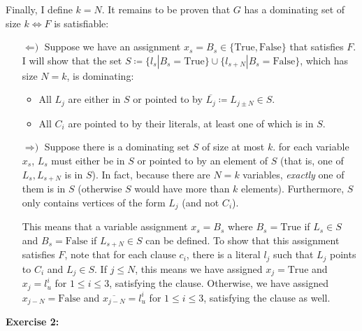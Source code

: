 \documentclass{amsart}
\theoremstyle{plain}
\theoremstyle{definition}
\begin{document}
    Finally, I define $k = N$.
    It remains to be proven that $G$ has a dominating set of size $k \iff F$ is satisfiable:


    \begin{itemize}

        \item[$\Longleftarrow\text{)}$] Suppose we have an assignment $x_s = B_s \in \{\text{True}, \text{False}\}$
        that satisfies $F$.
        I will show that the set $S \coloneqq \{l_s | B_s = \text{True}\} \cup \{l_{s+N} | B_s = \text{False}\}$,
        which has size $N=k$, is dominating:
        \begin{itemize}
            \item All $L_j$ are either in $S$ or pointed to by $ \overline{L_j} \coloneqq L_{j \pm N} \in S$.
            \item All $C_i$ are pointed to by their literals, at least one of which is in $S$.
        \end{itemize}

        \item[$\Longrightarrow\text{)}$] Suppose there is a dominating set $S$ of size at most $k$.
        for each variable $x_s$, $L_s$ must either be in $S$ or pointed to by an element of $S$
        (that is, one of $L_s, L_{s+N}$ is in $S$). In fact, because there are $N=k$ variables,
        \emph{exactly} one of them is in $S$ (otherwise $S$ would have more than $k$ elements).
        Furthermore, $S$ only contains vertices of the form $L_j$ (and not $C_i$).

        This means that a variable assignment $x_s = B_s$ where $B_s = \text{True}$
        if $L_s \in S$ and $B_s = \text{False}$ if $L_{s+N} \in S$ can be defined.
        To show that this assignment satisfies $F$, note that for each clause $c_i$, there is
        a literal $l_j$ such that $L_j$ points to $C_i$ and $L_j \in S$.
        If $j \leq N$, this means we have assigned $x_j = \text{True}$ and $x_j = l^i_u$ for $1 \leq i \leq 3$,
        satisfying the clause.
        Otherwise, we have assigned $x_{j-N} = \text{False}$ and $\overline{x_{j-N}} = l^i_u$ for $1 \leq i \leq 3$,
        satisfying the clause as well.

    \end{itemize}
    
    \textbf{Exercise 2:}


    \nocite{*}
    
    
\end{document}
